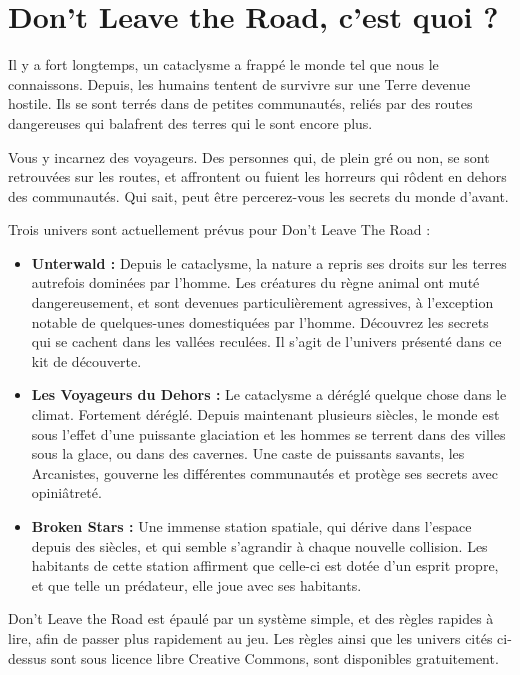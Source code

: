 \documentclass[10pt,twoside,twocolumn,openany,bg=print,justified]{dndbook}
\begin{document}
\tableofcontents

\chapter{Don't Leave the Road, c'est quoi ?}

Il y a fort longtemps, un cataclysme a frappé le monde tel que nous le connaissons. Depuis, les humains tentent de survivre sur une Terre devenue hostile. Ils se sont terrés dans de petites communautés, reliés par des routes dangereuses qui balafrent des terres qui le sont encore plus.

Vous y incarnez des voyageurs. Des personnes qui, de plein gré ou non, se sont retrouvées sur les routes, et affrontent ou fuient les horreurs qui rôdent en dehors des communautés. Qui sait, peut être percerez-vous les secrets du monde d'avant.

Trois univers sont actuellement prévus pour Don't Leave The Road :

\begin{itemize}

  \item \textbf{Unterwald :} Depuis le cataclysme, la nature a repris ses droits sur les terres autrefois dominées par l'homme. Les créatures du règne animal ont muté dangereusement, et sont devenues particulièrement agressives, à l'exception notable de quelques-unes domestiquées par l'homme. Découvrez les secrets qui se cachent dans les vallées reculées. Il s'agit de l'univers présenté dans ce kit de découverte.
  \item \textbf{Les Voyageurs du Dehors :} Le cataclysme a déréglé quelque chose dans le climat. Fortement déréglé. Depuis maintenant plusieurs siècles, le monde est sous l'effet d'une puissante glaciation et les hommes se terrent dans des villes sous la glace, ou dans des cavernes. Une caste de puissants savants, les Arcanistes, gouverne les différentes communautés et protège ses secrets avec opiniâtreté.
  \item \textbf{Broken Stars :} Une immense station spatiale, qui dérive dans l'espace depuis des siècles, et qui semble s'agrandir à chaque nouvelle collision. Les habitants de cette station affirment que celle-ci est dotée d'un esprit propre, et que telle un prédateur, elle joue avec ses habitants. 

\end{itemize}

Don't Leave the Road est épaulé par un système simple, et des règles rapides à lire, afin de passer plus rapidement au jeu. Les règles ainsi que les univers cités ci-dessus sont sous licence libre Creative Commons, sont disponibles gratuitement.
\end{document}
